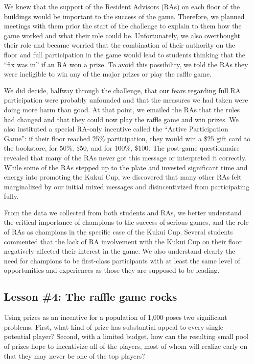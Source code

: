 \documentclass{acm_proc_article-sp}
\begin{document}
We knew that the support of the Resident Advisors (RAs) on each floor of the buildings would be important to the success of the game. Therefore, we planned meetings with them prior the start of the challenge to explain to them how the game worked and what their role could be.  Unfortunately, we also overthought their role and became worried that the combination of their authority on the floor and full participation in the game would lead to students thinking that the ``fix was in'' if an RA won a prize.  To avoid this possibility, we told the RAs they were ineligible to win any of the major prizes or play the raffle game.

We did decide, halfway through the challenge, that our fears regarding full RA participation were probably unfounded and that the measures we had taken were doing more harm than good.  At that point, we emailed the RAs that the rules had changed and that they could now play the raffle game and win prizes.  We also instituted a special RA-only incentive called the ``Active Participation Game'':   if their floor reached 25\% participation, they would win a \$25 gift card to the bookstore, for 50\%, \$50, and for 100\%, \$100.   The post-game questionnaire revealed that many of the RAs never got this message or interpreted it correctly. While some of the RAs stepped up to the plate and invested significant time and energy into promoting the Kukui Cup, we discovered that many other RAs felt marginalized by our initial mixed messages and disincentivized from participating fully.

From the data we collected from both students and RAs, we better understand the critical importance of champions to the success of serious games, and the role of RAs as champions in the specific case of the Kukui Cup.  Several students commented that the lack of RA involvement with the Kukui Cup on their floor negatively affected their interest in the game.  We also understand clearly the need for champions to be first-class participants with at least the same level of opportunities and experiences as those they are supposed to be leading.

\subsection{Lesson \#4: The raffle game rocks}

Using prizes as an incentive for a population of 1,000 poses two significant problems.  First, what kind of prize has substantial appeal to every single potential player?  Second, with a limited budget, how can the resulting small pool of prizes hope to incentivize all of the players, most of whom will realize early on that they may never be one of the top players?
\end{document}
